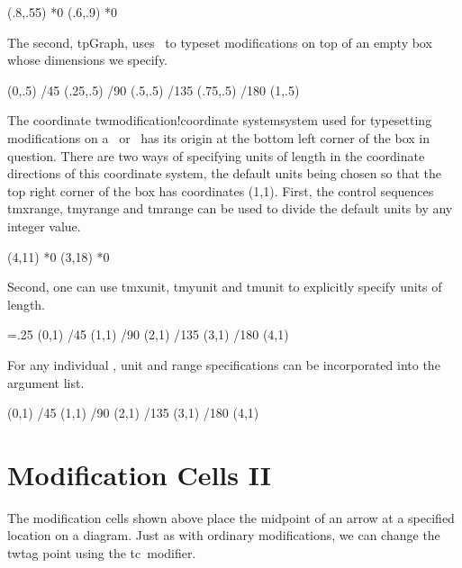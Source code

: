 \verbatim
  %  from the dvips distribution
\endverbatim
\eg
\Figure
\epsfxsize=3in
\Modify
{}           (.8,.55)  *0
   (.6,.9)   *0
\endFigure
\endeg

The second, \index tp{Graph}\endGraph, uses \csq\Figure\ to typeset
modifications on top of an empty box whose dimensions we specify.

\eg
\Graph{\hsize}{1.5cm}
\Two         (0,.5)
\Two /{45}   (.25,.5)
\Two /{90}   (.5,.5)
\Two /{135}  (.75,.5)
\Two /{180}  (1,.5)
\endGraph
\endeg

The coordinate \sindex tw{modification!coordinate system}system used
for typesetting modifications on a \csq\Figure\ or \csq\Graph\ has its
origin at the bottom left corner of the box in question.  There are
two ways of specifying units of length in the coordinate directions of
this coordinate system, the default units being chosen so that the top
right corner of the box has coordinates (1,1).  First, the control
sequences \index tm{xrange}, \index tm{yrange} and \index tm{range}
can be used to divide the default units by any integer value.

\ifAAAA \newpage \fi

\eg
{}  \gridlines
\Figure
\epsfxsize=3in
\Modify
{}           (4,11)  *0
   (3,18)  *0
\endFigure
\endeg

Second, one can use \index tm{xunit}, \index tm{yunit} and \index
tm{unit} to explicitly specify units of length.

\eg
\xunit=.25\hsize {} \gridlines
\Graph{\hsize}{1.5cm}
\Two (0,1)   \Two /{45} (1,1)   \Two /{90} (2,1)   \Two /{135} (3,1)   \Two /{180} (4,1)
\endGraph
\endeg

For any individual \csq\Graph, unit and range specifications can be
incorporated into the argument list.

\eg
\gridlines
{}
\Two (0,1)   \Two /{45} (1,1)   \Two /{90} (2,1)   \Two /{135} (3,1)   \Two /{180}  (4,1)
\endGraph
\endeg

\section{Modification Cells II}

The modification cells shown above place the midpoint of an arrow at a
specified location on a diagram. Just as with ordinary modifications,
we can change the \index tw{tag point} using the \index tc\*\
modifier.

